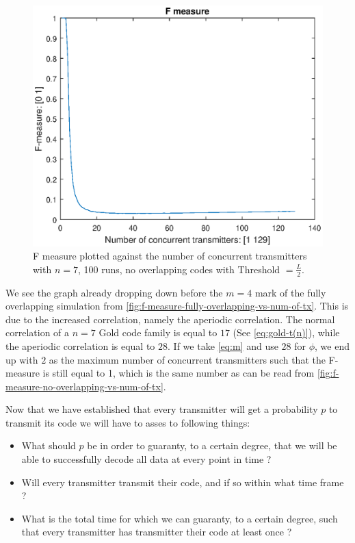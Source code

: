 		\begin{figure}[h]
			\centering
			\includegraphics[width=\textwidth]{chapters/f-measure-n=7-no-overlap-radio-a=1-100runs.eps}
			\caption{F measure plotted against the number of concurrent transmitters with $n = 7$, 100 runs, no overlapping codes with Threshold $= \frac{L}{2}$.}
			\label{fig:f-measure-no-overlapping-vs-num-of-tx}
		\end{figure}

		We see the graph already dropping down before the $m = 4$ mark of the fully overlapping simulation from \autoref{fig:f-measure-fully-overlapping-vs-num-of-tx}.
		This is due to the increased correlation, namely the aperiodic correlation.
		The normal correlation of a $n = 7$ Gold code family is equal to $17$ (See \autoref{eq:gold-t(n)}), while the aperiodic correlation is equal to $28$.
		If we take \autoref{eq:m} and use $28$ for $\phi$, we end up with $2$ as the maximum number of concurrent transmitters such that the F-measure is still equal to 1, which is the same number as can be read from \autoref{fig:f-measure-no-overlapping-vs-num-of-tx}.


		Now that we have established that every transmitter will get a probability $p$ to transmit its code we will have to asses to following things: 

		\begin{itemize}
			\item What should $p$ be in order to guaranty, to a certain degree, that we will be able to successfully decode all data at every point in time ?
			\item Will every transmitter transmit their code, and if so within what time frame ?
			\item What is the total time for which we can guaranty, to a certain degree, such that every transmitter has transmitter their code at least once ? 
		\end{itemize}




